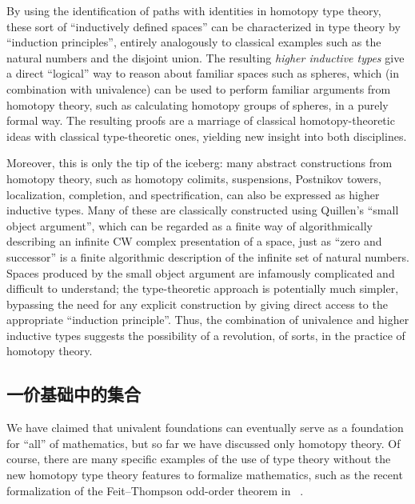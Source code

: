 By using the identification of paths with identities in homotopy type theory, these sort of ``inductively defined spaces'' can be characterized in type theory by ``induction principles'', entirely analogously to classical examples such as the natural numbers and the disjoint union.
The resulting \emph{higher inductive types}
%
give a direct ``logical'' way to reason about familiar spaces such as spheres, which (in combination with univalence) can be used to perform familiar arguments from homotopy theory, such as calculating homotopy groups of spheres, in a purely formal way.
The resulting proofs are a marriage of classical homotopy-theoretic ideas with classical type-theoretic ones, yielding new insight into both disciplines.

Moreover, this is only the tip of the iceberg: many abstract constructions from homotopy theory, such as homotopy colimits, suspensions, Postnikov towers, localization, completion, and spectrification, can also be expressed as higher inductive types.
Many of these are classically constructed using Quillen's ``small object argument'', which can be regarded as a finite way of algorithmically describing an infinite CW complex presentation of a space, just as ``zero and successor'' is a finite algorithmic description of the infinite set of natural numbers.
Spaces produced by the small object argument are infamously complicated and difficult to understand; the type-theoretic approach is potentially much simpler, bypassing the need for any explicit construction by giving direct access to the appropriate ``induction principle''.
Thus, the combination of univalence and higher inductive types suggests the possibility of a revolution, of sorts, in the practice of homotopy theory.


\subsection*{一价基础中的集合}

%

We have claimed that univalent foundations can eventually serve as a foundation for ``all'' of mathematics, but so far we have discussed 
only homotopy theory.  Of course, there are many specific examples of the use of type theory without the new homotopy type theory features to formalize mathematics,
%
%
%
%
%
such as the recent formalization of the Feit--Thompson odd-order theorem in \Coq~\cite{gonthier}.

